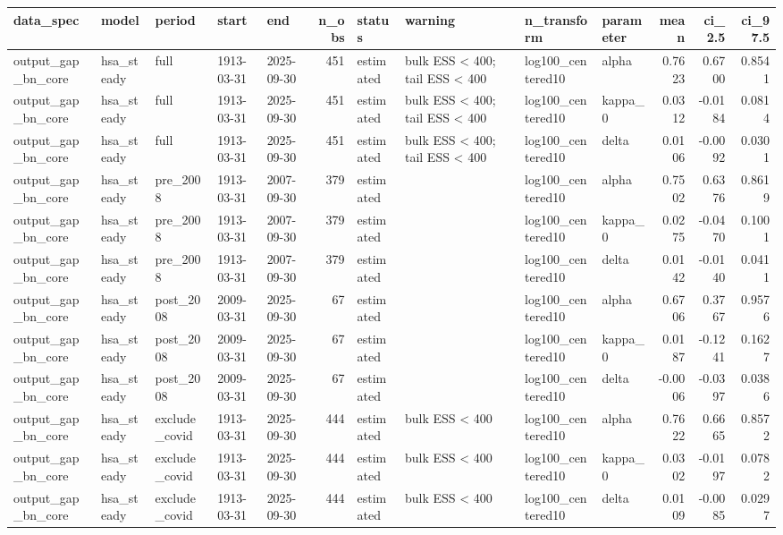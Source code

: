 \begin{tabular}{lllllrllllrrr}
\toprule
data\_spec & model & period & start & end & n\_obs & status & warning & n\_transform & parameter & mean & ci\_2.5 & ci\_97.5 \\
\midrule
output\_gap\_bn\_core & hsa\_steady & full & 1913-03-31 & 2025-09-30 & 451 & estimated & bulk ESS < 400; tail ESS < 400 & log100\_centered10 & alpha & 0.7623 & 0.6700 & 0.8541 \\
output\_gap\_bn\_core & hsa\_steady & full & 1913-03-31 & 2025-09-30 & 451 & estimated & bulk ESS < 400; tail ESS < 400 & log100\_centered10 & kappa\_0 & 0.0312 & -0.0184 & 0.0814 \\
output\_gap\_bn\_core & hsa\_steady & full & 1913-03-31 & 2025-09-30 & 451 & estimated & bulk ESS < 400; tail ESS < 400 & log100\_centered10 & delta & 0.0106 & -0.0092 & 0.0301 \\
output\_gap\_bn\_core & hsa\_steady & pre\_2008 & 1913-03-31 & 2007-09-30 & 379 & estimated &  & log100\_centered10 & alpha & 0.7502 & 0.6376 & 0.8619 \\
output\_gap\_bn\_core & hsa\_steady & pre\_2008 & 1913-03-31 & 2007-09-30 & 379 & estimated &  & log100\_centered10 & kappa\_0 & 0.0275 & -0.0470 & 0.1001 \\
output\_gap\_bn\_core & hsa\_steady & pre\_2008 & 1913-03-31 & 2007-09-30 & 379 & estimated &  & log100\_centered10 & delta & 0.0142 & -0.0140 & 0.0411 \\
output\_gap\_bn\_core & hsa\_steady & post\_2008 & 2009-03-31 & 2025-09-30 & 67 & estimated &  & log100\_centered10 & alpha & 0.6706 & 0.3767 & 0.9576 \\
output\_gap\_bn\_core & hsa\_steady & post\_2008 & 2009-03-31 & 2025-09-30 & 67 & estimated &  & log100\_centered10 & kappa\_0 & 0.0187 & -0.1241 & 0.1627 \\
output\_gap\_bn\_core & hsa\_steady & post\_2008 & 2009-03-31 & 2025-09-30 & 67 & estimated &  & log100\_centered10 & delta & -0.0006 & -0.0397 & 0.0386 \\
output\_gap\_bn\_core & hsa\_steady & exclude\_covid & 1913-03-31 & 2025-09-30 & 444 & estimated & bulk ESS < 400 & log100\_centered10 & alpha & 0.7622 & 0.6665 & 0.8572 \\
output\_gap\_bn\_core & hsa\_steady & exclude\_covid & 1913-03-31 & 2025-09-30 & 444 & estimated & bulk ESS < 400 & log100\_centered10 & kappa\_0 & 0.0302 & -0.0197 & 0.0782 \\
output\_gap\_bn\_core & hsa\_steady & exclude\_covid & 1913-03-31 & 2025-09-30 & 444 & estimated & bulk ESS < 400 & log100\_centered10 & delta & 0.0109 & -0.0085 & 0.0297 \\

\end{tabular}
